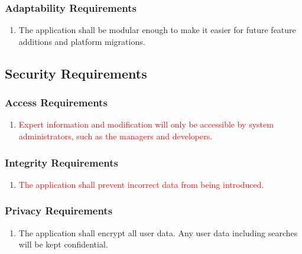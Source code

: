 \documentclass[titlepage]{article}
\newcounter{myCounter}
\begin{document}
\subsubsection{Adaptability Requirements}
\label{ssub:adaptability_requirements}
\begin{enumerate}[{MS}1. ]
    \setcounter{enumi}{\themyCounter}
    \item The application shall be modular enough to make it easier for future feature additions and
    platform migrations.
    \setcounter{myCounter}{\theenumi}
\end{enumerate}


\subsection{Security Requirements}
\label{sub:security_requirements}
\setcounter{myCounter}{0}

\subsubsection{Access Requirements}
\label{ssub:access_requirements}
\begin{enumerate}[{SR}1. ]
    \setcounter{enumi}{\themyCounter}
    \item \textcolor{red}{Expert information and modification will only be accessible by system
    administrators, such as the managers and developers.}
    \setcounter{myCounter}{\theenumi}
\end{enumerate}

\subsubsection{Integrity Requirements}
\label{ssub:integrity_requirements}
\begin{enumerate}[{SR}1. ]
    \setcounter{enumi}{\themyCounter}
    \item \textcolor{red}{The application shall prevent incorrect data from being introduced.}
    \setcounter{myCounter}{\theenumi}
\end{enumerate}

\subsubsection{Privacy Requirements}
\label{ssub:privacy_requirements}
\begin{enumerate}[{SR}1. ]
    \setcounter{enumi}{\themyCounter}
    \item The application shall encrypt all user data. Any user data including searches will be kept
    confidential.
    \setcounter{myCounter}{\theenumi}
\end{enumerate}
\end{document}
